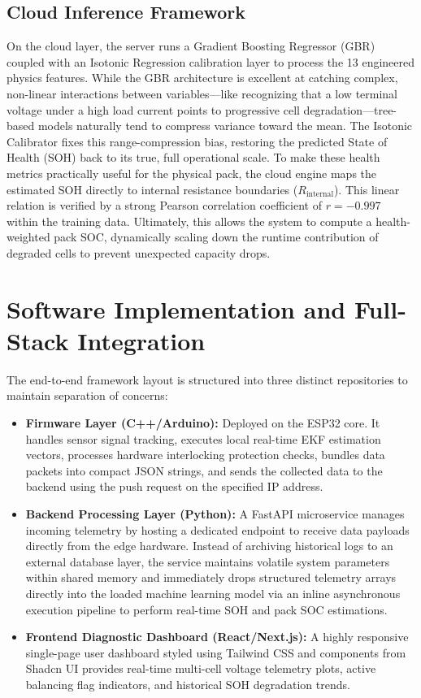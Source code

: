 \documentclass[conference]{IEEEtran}
\begin{document}
\subsection{Cloud Inference Framework}
On the cloud layer, the server runs a Gradient Boosting Regressor (GBR) coupled with an Isotonic Regression calibration layer to process the 13 engineered physics features. While the GBR architecture is excellent at catching complex, non-linear interactions between variables—like recognizing that a low terminal voltage under a high load current points to progressive cell degradation—tree-based models naturally tend to compress variance toward the mean. The Isotonic Calibrator fixes this range-compression bias, restoring the predicted State of Health (SOH) back to its true, full operational scale. To make these health metrics practically useful for the physical pack, the cloud engine maps the estimated SOH directly to internal resistance boundaries ($R_{\text{internal}}$). This linear relation is verified by a strong Pearson correlation coefficient of $r = -0.997$ within the training data. Ultimately, this allows the system to compute a health-weighted pack SOC, dynamically scaling down the runtime contribution of degraded cells to prevent unexpected capacity drops.

\section{Software Implementation and Full-Stack Integration}
The end-to-end framework layout is structured into three distinct repositories to maintain separation of concerns:
\begin{itemize}
    \item \textbf{Firmware Layer (C++/Arduino):} Deployed on the ESP32 core. It handles sensor signal tracking, executes local real-time EKF estimation vectors, processes hardware interlocking protection checks, bundles data packets into compact JSON strings, and sends the collected data to the backend using the push request on the specified IP address.
    \item \textbf{Backend Processing Layer (Python):} A FastAPI microservice manages incoming telemetry by hosting a dedicated endpoint to receive data payloads directly from the edge hardware. Instead of archiving historical logs to an external database layer, the service maintains volatile system parameters within shared memory and immediately drops structured telemetry arrays directly into the loaded machine learning model via an inline asynchronous execution pipeline to perform real-time SOH and pack SOC estimations.
    \item \textbf{Frontend Diagnostic Dashboard (React/Next.js):} A highly responsive single-page user dashboard styled using Tailwind CSS and components from Shadcn UI provides real-time multi-cell voltage telemetry plots, active balancing flag indicators, and historical SOH degradation trends.
\end{itemize}
\end{document}
